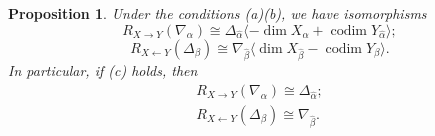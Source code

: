 \documentclass{amsart}
\theoremstyle{plain}
\newtheorem{prop}[subsubsection]{Proposition}
\theoremstyle{definition}
\theoremstyle{remark}
\numberwithin{equation}{subsection}
\begin{document}
\begin{prop}\label{p:radon}
Under the conditions (a)(b), we have isomorphisms
\begin{equation}\label{eq:xtoy}
R_{X\to Y}(\nabla_\alpha)\cong\Delta_{\hat{\alpha}}{\langle{{-\dim X_\alpha+\operatorname{codim} Y_{\hat{\alpha}}}}\rangle};
\end{equation}
\begin{equation}\label{eq:ytox}
R_{X\leftarrow Y}(\Delta_\beta)\cong\nabla_{\hat{\beta}}{\langle{{\dim X_{\hat{\beta}}-\operatorname{codim} Y_{\beta}}}\rangle}.
\end{equation}
In particular, if (c) holds, then
\begin{eqnarray*}
R_{X\to Y}(\nabla_\alpha)\cong\Delta_{\hat{\alpha}};\\
R_{X\leftarrow Y}(\Delta_\beta)\cong\nabla_{\hat{\beta}}.
\end{eqnarray*}
\end{prop}
\end{document}
